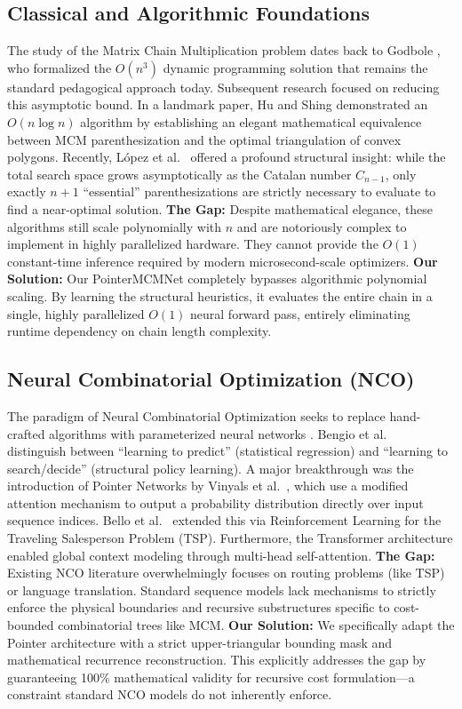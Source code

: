 \documentclass[conference]{IEEEtran}
\begin{document}
\subsection{Classical and Algorithmic Foundations}
The study of the Matrix Chain Multiplication problem dates back to Godbole \cite{b1}, who formalized the $O(n^3)$ dynamic programming solution that remains the standard pedagogical approach today. Subsequent research focused on reducing this asymptotic bound. In a landmark paper, Hu and Shing \cite{b2} demonstrated an $O(n \log n)$ algorithm by establishing an elegant mathematical equivalence between MCM parenthesization and the optimal triangulation of convex polygons. Recently, L\'{o}pez et al.\ \cite{b3} offered a profound structural insight: while the total search space grows asymptotically as the Catalan number $C_{n-1}$, only exactly $n+1$ ``essential'' parenthesizations are strictly necessary to evaluate to find a near-optimal solution. 
\textbf{The Gap:} Despite mathematical elegance, these algorithms still scale polynomially with $n$ and are notoriously complex to implement in highly parallelized hardware. They cannot provide the $O(1)$ constant-time inference required by modern microsecond-scale optimizers.
\textbf{Our Solution:} Our PointerMCMNet completely bypasses algorithmic polynomial scaling. By learning the structural heuristics, it evaluates the entire chain in a single, highly parallelized $O(1)$ neural forward pass, entirely eliminating runtime dependency on chain length complexity.

\subsection{Neural Combinatorial Optimization (NCO)}
The paradigm of Neural Combinatorial Optimization seeks to replace hand-crafted algorithms with parameterized neural networks \cite{b20}. Bengio et al.\ \cite{b21} distinguish between ``learning to predict'' (statistical regression) and ``learning to search/decide'' (structural policy learning). A major breakthrough was the introduction of Pointer Networks by Vinyals et al.\ \cite{b7}, which use a modified attention mechanism \cite{b9} to output a probability distribution directly over input sequence indices. Bello et al.\ \cite{b8} extended this via Reinforcement Learning for the Traveling Salesperson Problem (TSP). Furthermore, the Transformer architecture \cite{b11} enabled global context modeling through multi-head self-attention.
\textbf{The Gap:} Existing NCO literature overwhelmingly focuses on routing problems (like TSP) or language translation. Standard sequence models lack mechanisms to strictly enforce the physical boundaries and recursive substructures specific to cost-bounded combinatorial trees like MCM.
\textbf{Our Solution:} We specifically adapt the Pointer architecture with a strict upper-triangular bounding mask and mathematical recurrence reconstruction. This explicitly addresses the gap by guaranteeing 100\% mathematical validity for recursive cost formulation—a constraint standard NCO models do not inherently enforce.
\end{document}
